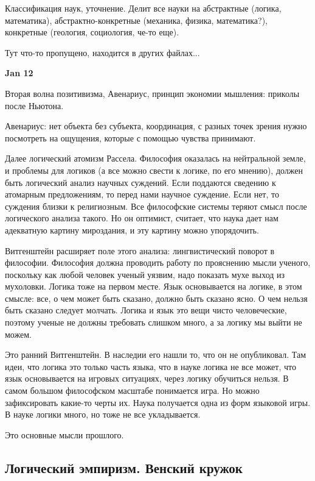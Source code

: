 \documentclass[a4paper, 12pt]{article}
\begin{document}
Классификация наук, уточнение. Делит все науки на абстрактные (логика, 
математика), абстрактно-конкретные (механика, физика, математика?), 
конкретные (геология, социология, че-то еще).


Тут что-то пропущено, находится в других файлах...

\hfill \textbf{Jan 12}

Вторая волна позитивизма, Авенариус, принцип экономии мышления: приколы 
после Ньютона.

Авенариус: нет объекта без субъекта, координация, с разных точек зрения 
нужно посмотреть на ощущения, которые с помощью чувства принимают.

Далее логический атомизм Рассела. Философия оказалась на нейтральной 
земле, и проблемы для логиков (а все можно свести к логике, по его 
мнению), должен быть логический анализ научных суждений. Если поддаются 
сведению к атомарным предложениям, то перед нами научное суждение. Если 
нет, то суждения близки к религиозным. Все философские системы теряют 
смысл после логического анализа такого. Но он оптимист, считает, что 
наука дает нам адекватную картину мироздания, и эту картину можно 
упорядочить.

Витгенштейн расширяет поле этого анализа: лингвистический поворот 
в философии. Философия должна проводить работу по прояснению мысли 
ученого, поскольку как любой человек ученый уязвим, надо показать мухе 
выход из мухоловки. Логика тоже на первом месте. Язык основывается на 
логике, в этом смысле: все, о чем может быть сказано, должно быть 
сказано ясно. О чем нельзя быть сказано следует молчать. Логика и язык 
это вещи чисто человеческие, поэтому ученые не должны требовать слишком 
много, а за логику мы выйти не можем.

Это ранний Витгенштейн. В наследии его нашли то, что он не опубликовал. 
Там идеи, что логика это только часть языка, что в науке логика не все 
может, что язык основывается на игровых ситуациях, через логику 
обучиться нельзя. В самом большом философском масштабе понимается игра. 
Но можно зафиксировать какие-то черты их. Наука получается одна из форм 
языковой игры. В науке логики много, но тоже не все укладывается.

Это основные мысли прошлого.

\subsection{Логический эмпиризм. Венский кружок}
\end{document}
